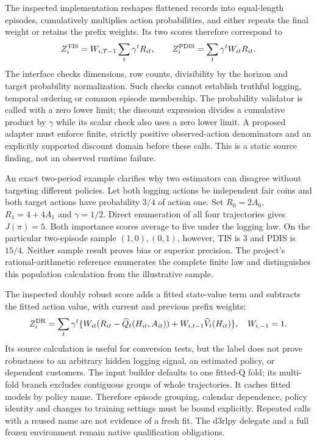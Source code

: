 The inspected implementation reshapes flattened records into equal-length
episodes, cumulatively multiplies action probabilities, and either repeats the
final weight or retains the prefix weights. Its two scores therefore correspond
to
\[
 Z_i^{\rm TIS}=W_{i,T-1}\sum_t\gamma^tR_{it},
 \qquad Z_i^{\rm PDIS}=\sum_t\gamma^tW_{it}R_{it}.
\]
The interface checks dimensions, row counts, divisibility by the horizon and
target probability normalization. Such checks cannot establish truthful
logging, temporal ordering or common episode membership. The probability
validator is called with a zero lower limit; the discount expression divides a
cumulative product by $\gamma$ while its scalar check also uses a zero lower
limit. A proposed adapter must enforce finite, strictly positive observed-action
denominators and an explicitly supported discount domain before these calls.
This is a static source finding, not an observed runtime failure.
\citep{exec23_scope_rl_sources}

An exact two-period example clarifies why two estimators can disagree without
targeting different policies. Let both logging actions be independent fair
coins and both target actions have probability $3/4$ of action one. Set
$R_0=2A_0$, $R_1=4+4A_1$ and $\gamma=1/2$. Direct enumeration of all four
trajectories gives $J(\pi)=5$. Both importance scores average to five under the
logging law. On the particular two-episode sample $(1,0),(0,1)$, however, TIS is
$3$ and PDIS is $15/4$. Neither sample result proves bias or superior precision.
The project's rational-arithmetic reference enumerates the complete finite law
and distinguishes this population calculation from the illustrative sample.
\citep{exec23_scope_rl_reference}

The inspected doubly robust score adds a fitted state-value term and subtracts
the fitted action value, with current and previous prefix weights:
\[
 Z_i^{\rm DR}=\sum_t\gamma^t
 \{W_{it}(R_{it}-\widehat Q_t(H_{it},A_{it}))
       +W_{i,t-1}\widehat V_t(H_{it})\},\quad W_{i,-1}=1.
\]
Its source calculation is useful for conversion tests, but the label does not
prove robustness to an arbitrary hidden logging signal, an estimated policy,
or dependent customers. The input builder defaults to one fitted-Q fold; its
multi-fold branch excludes contiguous groups of whole trajectories. It caches
fitted models by policy name. Therefore episode grouping, calendar dependence,
policy identity and changes to training settings must be bound explicitly.
Repeated calls with a reused name are not evidence of a fresh fit. The d3rlpy
delegate and a full frozen environment remain native qualification obligations.
\citep{exec23_scope_rl_sources}

